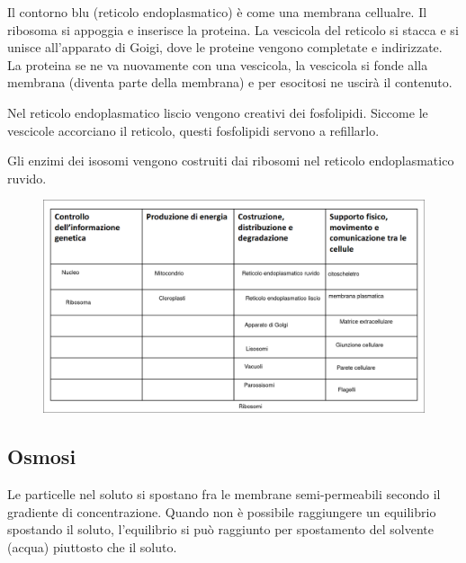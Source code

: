 \documentclass[a4paper]{article}
\begin{document}
Il contorno blu (reticolo endoplasmatico) è come una membrana cellualre. Il ribosoma si appoggia e inserisce la proteina.
La vescicola del reticolo si stacca e si unisce all'apparato di Goigi, dove le proteine
vengono completate e indirizzate.
La proteina se ne va nuovamente con una vescicola, la vescicola si fonde alla membrana (diventa parte della membrana)
e per esocitosi ne uscirà il contenuto.

Nel reticolo endoplasmatico liscio vengono creativi dei fosfolipidi.
Siccome le vescicole accorciano il reticolo, questi fosfolipidi servono a refillarlo.

Gli enzimi dei isosomi vengono costruiti dai ribosomi nel reticolo endoplasmatico ruvido.

\pagebreak

\begin{figure}[th]
    \centering
    \includegraphics[width=\textwidth]{./strutture.png}
\end{figure}

\pagebreak

\subsection{Osmosi}

Le particelle nel soluto si spostano fra le membrane semi-permeabili secondo il gradiente
di concentrazione. Quando non è possibile raggiungere un equilibrio spostando il soluto,
l'equilibrio si può raggiunto per spostamento del solvente (acqua) piuttosto che il soluto.

\end{document}
